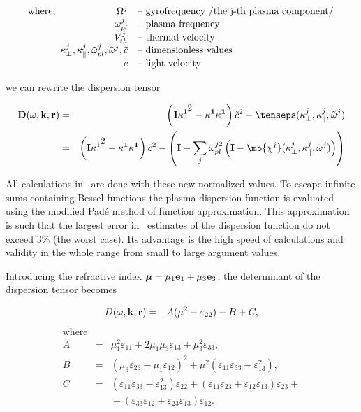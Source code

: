 \documentclass[a4,10pt]{article}
\begin{document}
\[
\mbox{ where,} \begin{array}[t]{rl}
 \Omega^{j} &  \mbox{-- gyrofrequency /the j-th plasma component/}\\
        \omega_{pl}^{j} &  \mbox{-- plasma frequency}\\
        V^{j}_{th} & \mbox{-- thermal velocity}\\
        \kappa_{\bot}^{j},\kappa_{\|}^{j},\tilde{\omega}_{pl}^{j},\tilde{\omega}^{j}, \tilde{c} &
         \mbox{-- dimensionless values} \\
    c & \mbox{-- light velocity}
\end{array}
\]

we can rewrite the dispersion tensor

\begin{eqnarray*}
{\bf D}(\omega,{\bf k},{\bf r}) & = & \left({\bf I}
\kappa^{1^{\textstyle 2}}-{\bf \kappa^{1}\kappa^{1}}\right)
\tilde{c}^{2}-\tenseps(\kappa^{j}_{\bot},\kappa^{j}_{\|},\tilde{\omega}^{j}) \\
& = & \left({\bf I}
\kappa^{1^{\textstyle 2}}-{\bf \kappa^{1}\kappa^{1}}\right)
\tilde{c}^{2}- \left({\bf I}-\sum_{j}\omega_{pl}^{j 2}
\left({\bf I}-\mb{\chi^{j}}
(\kappa^{j}_{\bot},\kappa^{j}_{\|},\tilde{\omega}^{j})\right)\right)
\end{eqnarray*}

All calculations in \WHAMP\ are done with these new normalized values.
To escape infinite sums containing Bessel functions the plasma  dispersion
function is evaluated using the modified Pad\'e method of function
approximation. This approximation is such that the largest error in \WHAMP\
estimates of the dispersion function do not exceed 3\% (the worst case).
Its advantage is the high speed of calculations and validity in the whole range from
small to large argument values.

Introducing the refractive index $\mbox{\boldmath $\mu$}=\mu_{1}{\bf e}_{1}+
\mu_{3}{\bf e}_{3}$, the determinant of the dispersion tensor becomes

\begin{eqnarray}
        D(\omega,{\bf k},{\bf r}) & = & A(\mu^{2}-\varepsilon_{22})-B+C \label{eq:dispfuncexpa},
\end{eqnarray}
\begin{eqnarray*}
\mbox{where}\\
        A & = & \mu_{1}^{2}\varepsilon_{11}+2\mu_{1}\mu_{3}\varepsilon_{13}+
                \mu^{2}_{3}\varepsilon_{33},\\
        B & = & (\mu_{3}\varepsilon_{23}-\mu_{1}\varepsilon_{12})^{2}+
                \mu^{2}(\varepsilon_{11}\varepsilon_{33}-\varepsilon_{13}^{2}),\\
        C & = & (\varepsilon_{11}\varepsilon_{33}-\varepsilon_{13}^{2})\varepsilon_{22}+
                (\varepsilon_{11}\varepsilon_{23}+\varepsilon_{12}\varepsilon_{13})\varepsilon_{23}+\\
        & & \mbox{}+(\varepsilon_{33}\varepsilon_{12}+\varepsilon_{23}\varepsilon_{13})\varepsilon_{12}.\\
\end{eqnarray*}
\end{document}
